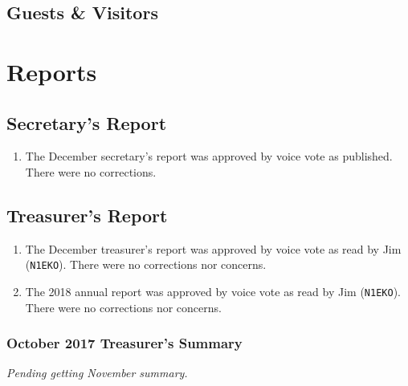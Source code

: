 \documentclass[10pt,letterpaper]{article}
\begin{document}
\subsection{Guests \& Visitors}


\section{Reports}

\subsection{Secretary's Report}
\begin{enumerate}
  \item The December secretary's report was approved by voice vote as published. There were no corrections.
\end{enumerate}

\newpage
\subsection{Treasurer's Report}
\begin{enumerate}
  \item The December treasurer's report was approved by voice vote as read by Jim (\texttt{N1EKO}). There were no corrections nor concerns.
  \item The 2018 annual report was approved by voice vote as read by Jim (\texttt{N1EKO}). There were no corrections nor concerns.
\end{enumerate}

\subsubsection{October 2017 Treasurer's Summary}
\noindent
\emph{Pending getting November summary.}
\end{document}
